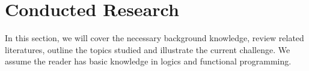 \begin{code}[hide]%
\>[0]\AgdaSymbol{\{-\#}\AgdaSpace{}%
\AgdaSpace{}%
\AgdaSpace{}%
\AgdaSymbol{\#-\}}\<%
\\
%
\\[\AgdaEmptyExtraSkip]%
\>[0]\AgdaSpace{}%
\AgdaSpace{}%
\<%
\\
\>[0]\AgdaSpace{}%
\AgdaSpace{}%
\<%
\\
\>[0]\AgdaSpace{}%
\AgdaSpace{}%
\<%
\\
\>[0]\AgdaSpace{}%
\AgdaSpace{}%
\<%
\\
\>[0]\AgdaSpace{}%
\AgdaSpace{}%
\<%
\\
\>[0]\AgdaSpace{}%
\AgdaSpace{}%
\<%
\\
%
\\[\AgdaEmptyExtraSkip]%
\>[0]\AgdaSpace{}%
\AgdaSymbol{:}\AgdaSpace{}%
\<%
\\
\>[0]\AgdaSpace{}%
\AgdaSymbol{=}\AgdaSpace{}%
\<%
\\
%
\\[\AgdaEmptyExtraSkip]%
\>[0]\AgdaSpace{}%
\AgdaSymbol{:}\AgdaSpace{}%
\<%
\\
\>[0]\AgdaSpace{}%
\AgdaSymbol{=}\AgdaSpace{}%
\<%
\\
%
\\[\AgdaEmptyExtraSkip]%
\>[0]\AgdaSpace{}%
\AgdaSpace{}%
\AgdaSpace{}%
\AgdaSpace{}%
\AgdaSymbol{:}\AgdaSpace{}%
\<%
\end{code}

\chapter{Conducted Research}

In this section, we will cover the necessary background knowledge, review related literatures, outline the topics studied and illustrate the current challenge. We assume the reader has basic knowledge in logics and functional programming.

